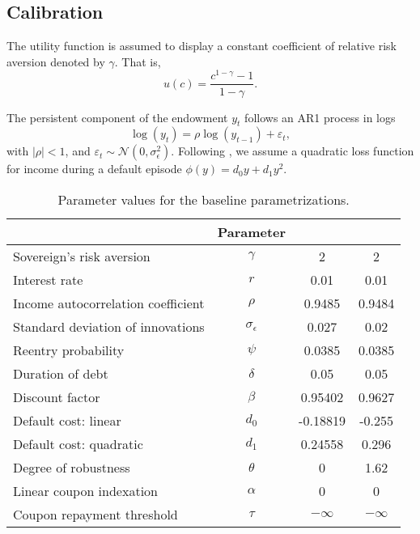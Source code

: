 \subsection{Calibration\label{calibration}}

The utility function is assumed to display a constant coefficient of relative risk aversion denoted by $\gamma$. That is, \begin{equation*} 
u\left( c\right) = \frac{c^{ 1-\gamma }-1}{1-\gamma }.
\end{equation*}

The persistent component of the endowment $y_{t}$ follows an AR1 process in logs
\begin{equation*}
\log (y_{t})=\rho \log(y_{t-1})+\varepsilon _{t},
\end{equation*}
with $|\rho |<1$, and $\varepsilon _{t}\sim \mathcal{N}\left( 0,\sigma_{\epsilon }^{2}\right)$. Following \cite{Chatty}, we assume a quadratic loss function for income during a default episode $\phi \left( y \right) = d_0 y + d_1 y^2$. 

\begin{table}[!hbtp]\centering \small
\caption{Parameter values for the baseline parametrizations.}\label{Table_parameters}
\begin{tabular}{@{}lccc@{}} \toprule
 & \textbf{Parameter} & \multicolumn{1}{G}{\cite{Chatty}} & \multicolumn{1}{G}{\textbf{\cite{PouzoPresno2016}}} \\\midrule
Sovereign's risk aversion   & $\gamma$ & 2 & 2 \\
Interest rate & $r$ & 0.01  & 0.01 \\
Income autocorrelation coefficient & $\rho $ & 0.9485 & 0.9484 \\
Standard deviation of innovations & $\sigma _{\epsilon }$ & 0.027 & 0.02\\
Reentry probability & $\psi $ & 0.0385 & 0.0385 \\
Duration of debt & $\delta $ &  0.05 & 0.05 \\
Discount factor & $\beta$ & 0.95402 & 0.9627 \\
Default cost: linear  & $d_0$  & -0.18819 & -0.255 \\
Default cost: quadratic  & $d_1$  & 0.24558  & 0.296 \\
Degree of robustness & $\theta$ & 0 & 1.62   \\
Linear coupon indexation & $\alpha$ & 0  & 0 \\
Coupon repayment threshold & $\tau$ & $-\infty$ & $-\infty$  \\
\bottomrule
\end{tabular}
\end{table}

